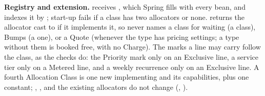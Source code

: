 \textbf{Registry and extension.}  receives , which Spring fills with every  bean, and indexes it by ; start-up fails if a class has two allocators or none.  returns the allocator cast to  if it implements it, so  never names a class for waiting (a  class), Bumps (a  one), or a Quote (whenever the type has pricing settings; a type without them is booked free, with no Charge). The marks a line may carry follow the class, as the  checks do: the Priority mark only on an Exclusive line, a service tier only on a Metered line, and a weekly recurrence only on an Exclusive line. A fourth Allocation Class is one new  implementing  and its capabilities, plus one  constant; , , and the existing allocators do not change (, ).

